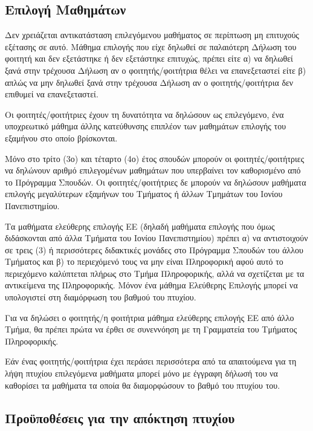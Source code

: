 \hypertarget{ux3b5ux3c0ux3b9ux3bbux3bfux3b3ux3ae-ux3bcux3b1ux3b8ux3b7ux3bcux3acux3c4ux3c9ux3bd}{%
\subsection{Επιλογή
Μαθημάτων}\label{ux3b5ux3c0ux3b9ux3bbux3bfux3b3ux3ae-ux3bcux3b1ux3b8ux3b7ux3bcux3acux3c4ux3c9ux3bd}}

Δεν χρειάζεται αντικατάσταση επιλεγόμενου μαθήματος σε περίπτωση μη
επιτυχούς εξέτασης σε αυτό. Μάθημα επιλογής που είχε δηλωθεί σε
παλαιότερη Δήλωση του φοιτητή και δεν εξετάστηκε ή δεν εξετάστηκε
επιτυχώς, πρέπει είτε α) να δηλωθεί ξανά στην τρέχουσα Δήλωση αν ο
φοιτητής/φοιτήτρια θέλει να επανεξεταστεί είτε β) απλώς να μην δηλωθεί
ξανά στην τρέχουσα Δήλωση αν ο φοιτητής/φοιτήτρια δεν επιθυμεί να
επανεξεταστεί.

Οι φοιτητές/φοιτήτριες έχουν τη δυνατότητα να δηλώσουν ως επιλεγόμενο,
ένα υποχρεωτικό μάθημα άλλης κατεύθυνσης επιπλέον των μαθημάτων επιλογής
του εξαμήνου στο οποίο βρίσκονται.

Μόνο στο τρίτο (3ο) και τέταρτο (4ο) έτος σπουδών μπορούν οι
φοιτητές/φοιτήτριες να δηλώνουν αριθμό επιλεγομένων μαθημάτων που
υπερβαίνει τον καθορισμένο από το Πρόγραμμα Σπουδών. Οι
φοιτητές/φοιτήτριες δε μπορούν να δηλώσουν μαθήματα επιλογής μεγαλύτερων
εξαμήνων του Τμήματος ή άλλων Τμημάτων του Ιονίου Πανεπιστημίου.

Τα μαθήματα ελεύθερης επιλογής ΕΕ (δηλαδή μαθήματα επιλογής που όμως
διδάσκονται από άλλα Τμήματα του Ιονίου Πανεπιστημίου) πρέπει α) να
αντιστοιχούν σε τρεις (3) ή περισσότερες διδακτικές μονάδες στο
Πρόγραμμα Σπουδών του άλλου Τμήματος και β) το περιεχόμενό τους να μην
είναι Πληροφορική αφού αυτό το περιεχόμενο καλύπτεται πλήρως στο Τμήμα
Πληροφορικής, αλλά να σχετίζεται με τα αντικείμενα της Πληροφορικής.
Μόνον ένα μάθημα Ελεύθερης Επιλογής μπορεί να υπολογιστεί στη διαμόρφωση
του βαθμού του πτυχίου.

Για να δηλώσει ο φοιτητής/η φοιτήτρια μάθημα ελεύθερης επιλογής ΕΕ από
άλλο Τμήμα, θα πρέπει πρώτα να έρθει σε συνεννόηση με τη Γραμματεία του
Τμήματος Πληροφορικής.

Εάν ένας φοιτητής/φοιτήτρια έχει περάσει περισσότερα από τα απαιτούμενα
για τη λήψη πτυχίου επιλεγόμενα μαθήματα μπορεί μόνο με έγγραφη δήλωσή
του να καθορίσει τα μαθήματα τα οποία θα διαμορφώσουν το βαθμό του
πτυχίου του.

\hypertarget{ux3c0ux3c1ux3bfux3cbux3c0ux3bfux3b8ux3adux3c3ux3b5ux3b9ux3c2-ux3b3ux3b9ux3b1-ux3c4ux3b7ux3bd-ux3b1ux3c0ux3ccux3baux3c4ux3b7ux3c3ux3b7-ux3c0ux3c4ux3c5ux3c7ux3afux3bfux3c5}{%
\subsection{Προϋποθέσεις για την απόκτηση
πτυχίου}\label{ux3c0ux3c1ux3bfux3cbux3c0ux3bfux3b8ux3adux3c3ux3b5ux3b9ux3c2-ux3b3ux3b9ux3b1-ux3c4ux3b7ux3bd-ux3b1ux3c0ux3ccux3baux3c4ux3b7ux3c3ux3b7-ux3c0ux3c4ux3c5ux3c7ux3afux3bfux3c5}}

